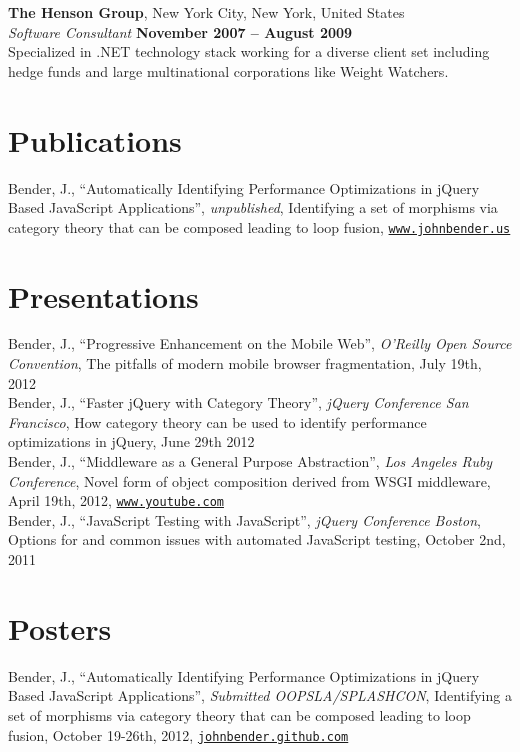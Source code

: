 \documentclass[margin,line]{resume}
\begin{document}
\begin{resume}
  \textbf{The Henson Group}, New York City, New York, United States \vspace{1mm}\\
  \textsl{Software Consultant} \hfill \textbf{November 2007 -- August 2009}\\
  Specialized in .NET technology stack working for a diverse client set including hedge funds and large multinational corporations like Weight Watchers.

  \section{\mysidestyle Publications}
  Bender, J., ``Automatically Identifying Performance Optimizations in jQuery Based JavaScript Applications'', \textsl{unpublished}, Identifying a set of morphisms via category theory that can be composed leading to loop fusion, \href{http://johnbender.us/auto-js.pdf}{\texttt{www.johnbender.us}}

  \section{\mysidestyle Presentations}
  Bender, J., ``Progressive Enhancement on the Mobile Web'', \textsl{O'Reilly Open Source Convention}, The pitfalls of modern mobile browser fragmentation, July 19th, 2012\vspace{2mm}\\
  Bender, J., ``Faster jQuery with Category Theory'', \textsl{jQuery Conference San Francisco}, How category theory can be used to identify performance optimizations in jQuery, June 29th 2012 \vspace{2mm}\\
  Bender, J., ``Middleware as a General Purpose Abstraction'', \textsl{Los Angeles Ruby Conference}, Novel form of object composition derived from WSGI middleware, April 19th, 2012, \href{http://www.youtube.com/watch?feature=player_embedded&v=fcNaiP5tea0}{\texttt{www.youtube.com}} \vspace{2mm}\\
  Bender, J., ``JavaScript Testing with JavaScript'', \textsl{jQuery Conference Boston}, Options for and common issues with automated JavaScript testing, October 2nd, 2011

  \section{\mysidestyle Posters}
  Bender, J., ``Automatically Identifying Performance Optimizations in jQuery Based JavaScript Applications'', \textsl{Submitted OOPSLA/SPLASHCON}, Identifying a set of morphisms via category theory that can be composed leading to loop fusion, October 19-26th, 2012, \href{http://johnbender.github.com/auto-jquery-optimization-paper/}{\texttt{johnbender.github.com}}



\end{resume}
\end{document}
